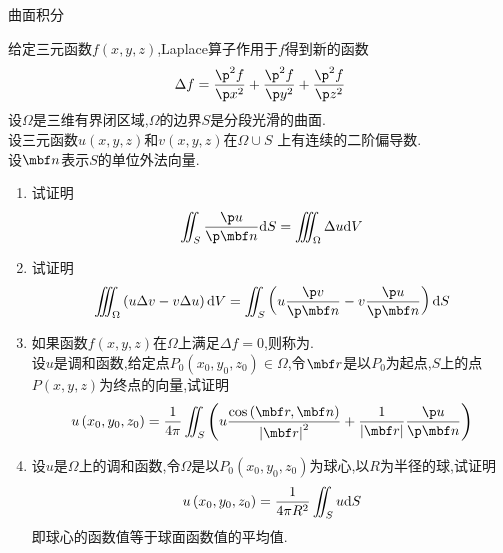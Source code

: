 \documentclass{ctexart}
\begin{document}
\pagestyle{empty}
\begin{center}\large 曲面积分\end{center}
\begin{problem}[A.1]
    给定三元函数$f(x,y,z)$,Laplace算子作用于$f$得到新的函数
    \[\Delta f=\dfrac{\p^2 f}{\p x^2}+\dfrac{\p^2 f}{\p y^2}+\dfrac{\p^2 f}{\p z^2}\]
    设$\Omega$是三维有界闭区域,$\Omega$的边界$S$是分段光滑的曲面.\\
    设三元函数$u(x,y,z)$和$v(x,y,z)$在$\Omega\cup S$%
    上有连续的二阶偏导数.\\
    设$\mbf n$表示$S$的单位外法向量.
    \begin{enumerate}[label=\tbf{(\arabic*)}]
        \item 试证明\[\iint_S\dfrac{\p u}{\p\mbf n}\di S=\iiint_\Omega\Delta u\di V\]
        \item 试证明\[\iiint_\Omega\left(u\Delta v-v\Delta u\right)\di V=\iint_S\left(u\dfrac{\p v}{\p\mbf n}-v\dfrac{\p u}{\p\mbf n}\right)\di S\]
        \item 如果函数$f(x,y,z)$在$\Omega$上满足$\Delta f=0$,则称为.\\
            设$u$是调和函数,给定点$P_0\left(x_0,y_0,z_0\right)\in\Omega$,令$\mbf r$是以$P_0$为起点,$S$上的点$P(x,y,z)$为终点的向量,试证明
            \[u\left(x_0,y_0,z_0\right)=\dfrac{1}{4\pi}\iint_S\left(u\dfrac{\cos\left(\mbf r,\mbf n\right)}{\left|\mbf r\right|^2}+\dfrac{1}{\left|\mbf r\right|}\dfrac{\p u}{\p\mbf n}\right)\]
        \item 设$u$是$\Omega$上的调和函数,令$\Omega$是以$P_0\left(x_0,y_0,z_0\right)$为球心,以$R$为半径的球,试证明
            \[u\left(x_0,y_0,z_0\right)=\dfrac{1}{4\pi R^2}\iint_S u\mathrm{d} S\]
            即球心的函数值等于球面函数值的平均值.
    \end{enumerate}
\end{problem}
\end{document}
